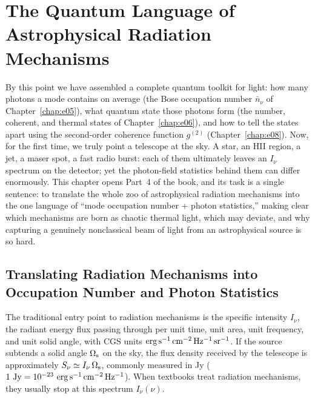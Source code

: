 \chapter{The Quantum Language of Astrophysical Radiation Mechanisms}
\label{chap:e16}

\begin{chapteropening}
By this point we have assembled a complete quantum toolkit for light: how many photons a mode contains on average (the Bose occupation number \(\bar n_\nu\) of Chapter~\ref{chap:e05}), what quantum state those photons form (the number, coherent, and thermal states of Chapter~\ref{chap:e06}), and how to tell the states apart using the second-order coherence function \(g^{(2)}\) (Chapter~\ref{chap:e08}). Now, for the first time, we truly point a telescope at the sky. A star, an HII region, a jet, a maser spot, a fast radio burst: each of them ultimately leaves an \(I_\nu\) spectrum on the detector; yet the photon-field statistics behind them can differ enormously. This chapter opens Part~4 of the book, and its task is a single sentence: to translate the whole zoo of astrophysical radiation mechanisms into the one language of ``mode occupation number + photon statistics,'' making clear which mechanisms are born as chaotic thermal light, which may deviate, and why capturing a genuinely nonclassical beam of light from an astrophysical source is so hard.
\end{chapteropening}

\section{Translating Radiation Mechanisms into Occupation Number and Photon Statistics}
\label{sec:e16-translation}

The traditional entry point to radiation mechanisms is the specific intensity \(I_\nu\), the radiant energy flux passing through per unit time, unit area, unit frequency, and unit solid angle, with CGS units \({\rm erg\,s^{-1}\,cm^{-2}\,Hz^{-1}\,sr^{-1}}\). If the source subtends a solid angle \(\Omega_{\rm s}\) on the sky, the flux density received by the telescope is approximately \(S_\nu\simeq I_\nu\,\Omega_{\rm s}\), commonly measured in Jy (\(1~{\rm Jy}=10^{-23}~{\rm erg\,s^{-1}\,cm^{-2}\,Hz^{-1}}\)). When textbooks treat radiation mechanisms, they usually stop at this spectrum \(I_\nu(\nu)\).

